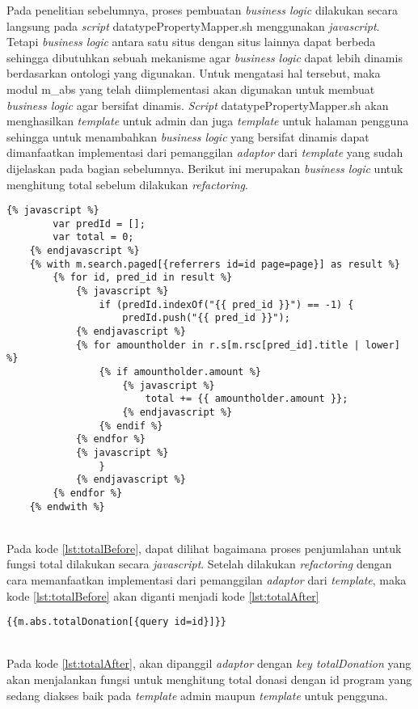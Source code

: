 	Pada penelitian sebelumnya, proses pembuatan \textit{business logic} dilakukan secara langsung pada \textit{script} datatypePropertyMapper.sh menggunakan \textit{javascript}. Tetapi \textit{business logic} antara satu situs dengan situs lainnya dapat berbeda sehingga dibutuhkan sebuah mekanisme agar \textit{business logic} dapat lebih dinamis berdasarkan ontologi yang digunakan. Untuk mengatasi hal tersebut, maka modul m\_abs yang telah diimplementasi akan digunakan untuk membuat \textit{business logic} agar bersifat dinamis. \textit{Script} datatypePropertyMapper.sh akan menghasilkan \textit{template} untuk admin dan juga \textit{template} untuk halaman pengguna sehingga untuk menambahkan \textit{business logic} yang bersifat dinamis dapat dimanfaatkan implementasi dari pemanggilan \textit{adaptor} dari \textit{template} yang sudah dijelaskan pada bagian sebelumnya. Berikut ini merupakan \textit{business logic} untuk menghitung total sebelum dilakukan \textit{refactoring}.
	
	\begin{minipage}{\linewidth}
	\begin{lstlisting}[caption={Fungsi total sebelum refactoring},label={lst:totalBefore}]
	{% javascript %}
		var predId = [];
		var total = 0;
	{% endjavascript %}
	{% with m.search.paged[{referrers id=id page=page}] as result %}
		{% for id, pred_id in result %}
			{% javascript %}
				if (predId.indexOf("{{ pred_id }}") == -1) {
					predId.push("{{ pred_id }}");
			{% endjavascript %}
			{% for amountholder in r.s[m.rsc[pred_id].title | lower] %}
				{% if amountholder.amount %}
					{% javascript %}
						total += {{ amountholder.amount }};
					{% endjavascript %}
				{% endif %}
			{% endfor %}
			{% javascript %}
				}
			{% endjavascript %}
		{% endfor %}
	{% endwith %}
	\end{lstlisting}
	\end{minipage} \\

	Pada kode \ref{lst:totalBefore}, dapat dilihat bagaimana proses penjumlahan untuk fungsi total dilakukan secara \textit{javascript}. Setelah dilakukan \textit{refactoring} dengan cara memanfaatkan implementasi dari pemanggilan \textit{adaptor} dari \textit{template}, maka kode \ref{lst:totalBefore} akan diganti menjadi kode \ref{lst:totalAfter}
	\begin{minipage}{\linewidth}
	\begin{lstlisting}[caption={Fungsi total setelah refactoring}, label={lst:totalAfter}]
	{{m.abs.totalDonation[{query id=id}]}}
	\end{lstlisting}
	\end{minipage} \\

	Pada kode \ref{lst:totalAfter}, akan dipanggil \textit{adaptor} dengan \textit{key totalDonation} yang akan menjalankan fungsi untuk menghitung total donasi dengan id program yang sedang diakses baik pada \textit{template} admin maupun \textit{template} untuk pengguna.
